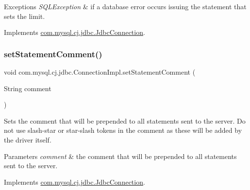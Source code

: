 \begin{DoxyExceptions}{Exceptions}
{\em S\+Q\+L\+Exception} & if a database error occurs issuing the statement that sets the limit. \\
\hline
\end{DoxyExceptions}


Implements \mbox{\hyperlink{interfacecom_1_1mysql_1_1cj_1_1jdbc_1_1_jdbc_connection_aec5eb42d9facdbd97b0a5238022af05d}{com.\+mysql.\+cj.\+jdbc.\+Jdbc\+Connection}}.

\mbox{\label{classcom_1_1mysql_1_1cj_1_1jdbc_1_1_connection_impl_ae62d28e9ed05949b66aa0ea00633d51d}} 
\subsubsection{\texorpdfstring{set\+Statement\+Comment()}{setStatementComment()}}
{\footnotesize\ttfamily void com.\+mysql.\+cj.\+jdbc.\+Connection\+Impl.\+set\+Statement\+Comment (\begin{DoxyParamCaption}\item[{String}]{comment }\end{DoxyParamCaption})}

Sets the comment that will be prepended to all statements sent to the server. Do not use slash-\/star or star-\/slash tokens in the comment as these will be added by the driver itself.


\begin{DoxyParams}{Parameters}
{\em comment} & the comment that will be prepended to all statements sent to the server. \\
\hline
\end{DoxyParams}


Implements \mbox{\hyperlink{interfacecom_1_1mysql_1_1cj_1_1jdbc_1_1_jdbc_connection_adfbd59fbebd013673ed3eb97beb76179}{com.\+mysql.\+cj.\+jdbc.\+Jdbc\+Connection}}.

\mbox{\label{classcom_1_1mysql_1_1cj_1_1jdbc_1_1_connection_impl_a5555f54beb90978116a2c340a4f11ff3}} 
